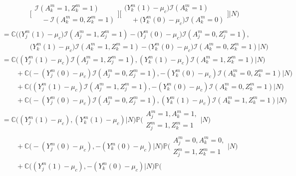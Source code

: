 \documentclass[12pt]{extarticle}
\newcommand{\pp}{\mathbb{P}}
\newcommand{\indicator}{\mathcal{I}}
\newcommand{\cV}{\mathbb{C}}
\begin{document}
{{\begin{align*}
& \qquad \qquad  \Big[ \begin{array}{l}
               \indicator(A^m_k=1,Z^m_k=1) \\
               \quad - \indicator(A^m_k=0,Z^m_k=1)
               \end{array}\Big] \Big[\begin{array}{l}
               \big(Y^m_k(1)-\mu_c\big)\indicator(A^m_k=1) \\
               \quad + \big(Y^m_k(0)-\mu_c\big)\indicator(A^m_k=0)
               \end{array}\Big] \Big|N \Big) \nonumber \\   
&= \cV\Big(\big(Y^m_j(1)-\mu_c\big)\indicator(A^m_j=1,Z^m_j=1) - \big(Y^m_j(0)-\mu_c\big)\indicator(A^m_j=0,Z^m_j=1), ~ \nonumber \\
& \qquad \qquad \big(Y^m_k(1)-\mu_c\big)\indicator(A^m_k=1,Z^m_k=1) - \big(Y^m_k(0)-\mu_c\big)\indicator(A^m_k=0,Z^m_k=1)\Big|N\Big)                                \nonumber \\
&= \cV\Big((Y^m_j(1)-\mu_c)\indicator(A^m_j=1,Z^m_j=1),(Y^m_k(1)-\mu_c)\indicator(A^m_k=1,Z^m_k=1)\Big|N\Big) ~ \nonumber \\
& \qquad + \cV\Big(-(Y^m_j(0)-\mu_c)\indicator(A^m_j=0,Z^m_j=1),-(Y^m_k(0)-\mu_c)\indicator(A^m_k=0,Z^m_k=1)\Big|N\Big) ~ \nonumber \\
& \qquad + \cV\Big((Y^m_j(1)-\mu_c)\indicator(A^m_j=1,Z^m_j=1),-(Y^m_k(0)-\mu_c)\indicator(A^m_k=0,Z^m_k=1)\Big|N\Big) ~ \nonumber \\
& \qquad + \cV\Big(-(Y^m_j(0)-\mu_c)\indicator(A^m_j=0,Z^m_j=1),(Y^m_k(1)-\mu_c)\indicator(A^m_k=1,Z^m_k=1)\Big|N\Big) \nonumber \\
&= \cV\Big((Y^m_j(1)-\mu_c),(Y^m_k(1)-\mu_c)\Big|N\Big)
              \pp\Big(\begin{array}{l}
                      A^m_j=1,A^m_k=1, \\
                      Z^m_j=1,Z^m_k=1\end{array}\Big|N\Big) \\
& \qquad + \cV\Big(-(Y^m_j(0)-\mu_c),-(Y^m_k(0)-\mu_c)\Big|N\Big)
              \pp\Big(\begin{array}{l}
                      A^m_j=0,A^m_k=0, \\
                      Z^m_j=1,Z^m_k=1\end{array}\Big|N\Big)  \\
& \qquad + \cV\Big((Y^m_j(1)-\mu_c),-(Y^m_k(0)-\mu_c)\Big|N\Big)
              \pp\Big(\begin{array}{l}

\end{array}
\end{align*}}}
\end{document}
